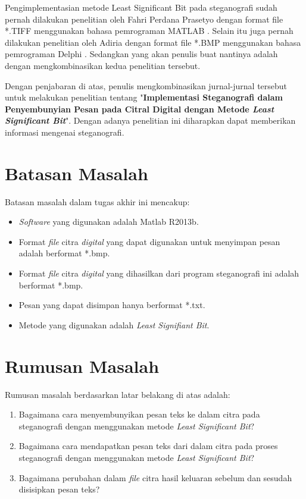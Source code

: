 Pengimplementasian metode Least Significant Bit pada steganografi sudah pernah dilakukan penelitian oleh Fahri Perdana Prasetyo dengan format file *.TIFF menggunakan bahasa pemrograman MATLAB \cite{prasetyo}. Selain itu juga pernah dilakukan penelitian oleh Adiria dengan format file *.BMP menggunakan bahasa pemrograman Delphi \cite{adiria}. Sedangkan yang akan penulis buat nantinya adalah dengan mengkombinasikan kedua penelitian tersebut.

Dengan penjabaran di atas, penulis mengkombinasikan jurnal-jurnal tersebut untuk melakukan penelitian tentang "\textbf{Implementasi Steganografi dalam Penyembunyian Pesan pada Citral Digital dengan Metode \emph{Least Significant Bit}}". Dengan adanya penelitian ini diharapkan dapat memberikan informasi mengenai steganografi.

\section{Batasan Masalah}
Batasan masalah dalam tugas akhir ini mencakup:
\begin{itemize}
	\item \emph{Software} yang digunakan adalah Matlab R2013b.
	\item Format \emph{file}  citra \emph{digital} yang dapat digunakan untuk menyimpan pesan adalah berformat *.bmp.
	\item Format \emph{file}  citra \emph{digital} yang dihasilkan dari program steganografi ini adalah berformat *.bmp.
	\item Pesan yang dapat disimpan hanya berformat *.txt.
	\item Metode yang digunakan adalah \emph{Least Signifiant Bit}.
\end{itemize}

\section{Rumusan Masalah}
Rumusan masalah berdasarkan latar belakang di atas adalah:
\begin{enumerate}
	\item Bagaimana cara menyembunyikan pesan teks ke dalam citra pada steganografi dengan menggunakan metode \emph{Least Significant Bit}?
	\item Bagaimana cara mendapatkan pesan teks dari dalam citra pada proses steganografi dengan menggunakan metode \emph{Least Significant Bit}?
	\item Bagaimana perubahan dalam \emph{file} citra hasil keluaran sebelum dan sesudah disisipkan pesan teks?
\end{enumerate}


